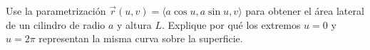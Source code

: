 Use la parametrización $\vec r(u,v)=\langle a\cos u,a\sin u,v\rangle$ para obtener el área lateral de un cilindro de radio $a$ y altura $L$. Explique por qué los extremos $u=0$ y $u=2\pi$ representan la misma curva sobre la superficie.
